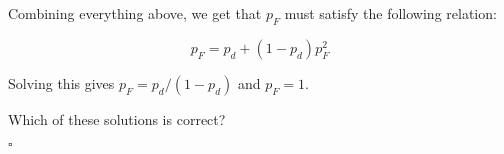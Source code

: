 
Combining everything above, we get that $p_F$ must satisfy the following relation:

\begin{equation}
p_F = p_d + (1-p_d)p_F^2
\end{equation}


Solving this gives $p_F = p_d / (1 - p_d)$ and $p_F = 1$. 

Which of these solutions is correct? 








$\square$




